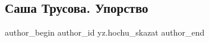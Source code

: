  
 
 
 
 
\subsection{Саша Трусова. Упорство}
\label{sec:18_01_2022.yz.hochu_skazat.1.trusova}

\ifcmt
 author_begin
   author_id yz.hochu_skazat
 author_end
\fi

